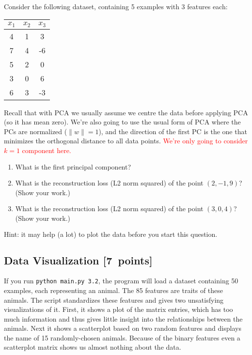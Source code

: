 \documentclass{article}
\newcommand{\blu}[1]{{\textcolor{blu}{#1}}}
\newcommand{\red}[1]{\textcolor{red}{#1}}
\let\ask\blu
\let\update\red
\newcommand\pts[1]{\textcolor{pointscolour}{[#1~points]}}
\newcommand{\norm}[1]{\lVert #1 \rVert}
\begin{document}
Consider the following dataset, containing 5 examples with 3 features each:
\begin{center}
  \begin{tabular}{ccc}
    $x_1$ & $x_2$ & $x_3$ \\
    \hline
     4 &  1 &  3 \\
     7 &  4 &  -6 \\
     5 &  2 &  0 \\
     3 &  0 & 6 \\
     6 & 3 &  -3 \\
  \end{tabular}
\end{center}
Recall that with PCA we usually assume we centre the data before applying PCA (so it has mean zero).
We're also going to use the usual form of PCA where the PCs are normalized ($\norm{w} = 1$),
and the direction of the first PC is the one that minimizes the orthogonal distance to all data points.
\update{We're only going to consider $k = 1$ component here.}
\begin{enumerate}
  \item \ask{What is the first principal component?}
  \item \ask{What is the reconstruction loss (L2 norm squared) of the point $(2, -1, 9)$? (Show your work.)}
  \item \ask{What is the reconstruction loss (L2 norm squared) of the point $(3, 0, 4)$? (Show your work.)}
\end{enumerate}
Hint: it may help (a lot) to plot the data before you start this question.



\subsection{Data Visualization \pts{7}}

If you run \verb|python main.py 3.2|, the program will load a dataset containing 50 examples, each representing an animal.
The 85 features are traits of these animals.
The script standardizes these features and gives two unsatisfying visualizations of it.
First, it shows a plot of the matrix entries, which has too much information and thus gives little insight into the relationships between the animals.
Next it shows a scatterplot based on two random features and displays the name of 15 randomly-chosen animals.
Because of the binary features even a scatterplot matrix shows us almost nothing about the data.
\end{document}
